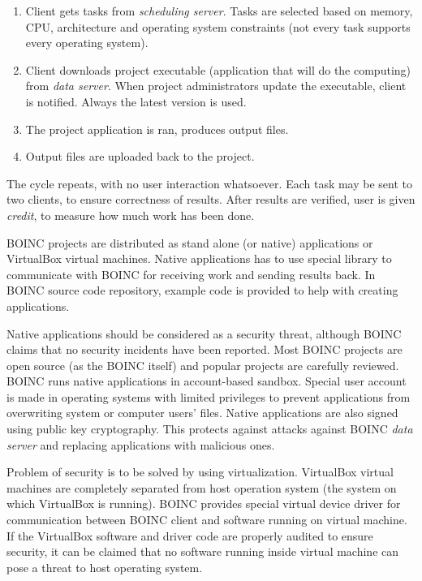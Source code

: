 \begin{enumerate}
\item Client gets tasks from \emph{scheduling server}. Tasks are selected based on memory, CPU, architecture and operating system constraints (not every task supports every operating system).
\item Client downloads project executable (application that will do the computing) from \emph{data server}. When project administrators update the executable, client is notified. Always the latest version is used.
\item The project application is ran, produces output files.
\item Output files are uploaded back to the project.
\end{enumerate}

The cycle repeats, with no user interaction whatsoever. Each task may be sent to two clients, to ensure correctness of results. After results are verified, user is given \emph{credit}, to measure how much work has been done.

BOINC projects are distributed as stand alone (or native) applications or VirtualBox virtual machines. Native applications has to use special library to communicate with BOINC for receiving work and sending results back. In BOINC source code repository, example code is provided to help with creating applications.

Native applications should be considered as a security threat, although BOINC claims that no security incidents have been reported. Most BOINC projects are open source (as the BOINC itself) and popular projects are carefully reviewed. BOINC runs native applications in account-based sandbox. Special user account is made in operating systems with limited privileges to prevent applications from overwriting system or computer users' files. Native applications are also signed using public key cryptography. This protects against attacks against BOINC \emph{data server} and replacing applications with malicious ones.

Problem of security is to be solved by using virtualization. VirtualBox virtual machines are completely separated from host operation system (the system on which VirtualBox is running). BOINC provides special virtual device driver for communication between BOINC client and software running on virtual machine. If the VirtualBox software and driver code are properly audited to ensure security, it can be claimed that no software running inside virtual machine can pose a threat to host operating system.

